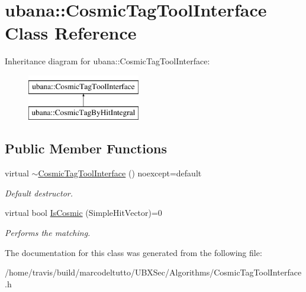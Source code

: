 \hypertarget{classubana_1_1CosmicTagToolInterface}{\section{ubana\-:\-:Cosmic\-Tag\-Tool\-Interface Class Reference}
\label{classubana_1_1CosmicTagToolInterface}
}
Inheritance diagram for ubana\-:\-:Cosmic\-Tag\-Tool\-Interface\-:\begin{figure}[H]
\begin{center}
\leavevmode
\includegraphics[height=2.000000cm]{classubana_1_1CosmicTagToolInterface}
\end{center}
\end{figure}
\subsection*{Public Member Functions}
\begin{DoxyCompactItemize}
\item 
\hypertarget{classubana_1_1CosmicTagToolInterface_a35cb79907a7bbf8edf501bd68d565797}{virtual \hyperlink{classubana_1_1CosmicTagToolInterface_a35cb79907a7bbf8edf501bd68d565797}{$\sim$\-Cosmic\-Tag\-Tool\-Interface} () noexcept=default}\label{classubana_1_1CosmicTagToolInterface_a35cb79907a7bbf8edf501bd68d565797}

\begin{DoxyCompactList}\small\item\em Default destructor. \end{DoxyCompactList}\item 
\hypertarget{classubana_1_1CosmicTagToolInterface_a5363b61b1dfab1e6b9cade4b3eed2c66}{virtual bool \hyperlink{classubana_1_1CosmicTagToolInterface_a5363b61b1dfab1e6b9cade4b3eed2c66}{Is\-Cosmic} (Simple\-Hit\-Vector)=0}\label{classubana_1_1CosmicTagToolInterface_a5363b61b1dfab1e6b9cade4b3eed2c66}

\begin{DoxyCompactList}\small\item\em Performs the matching. \end{DoxyCompactList}\end{DoxyCompactItemize}


The documentation for this class was generated from the following file\-:\begin{DoxyCompactItemize}
\item 
/home/travis/build/marcodeltutto/\-U\-B\-X\-Sec/\-Algorithms/Cosmic\-Tag\-Tool\-Interface.\-h\end{DoxyCompactItemize}
